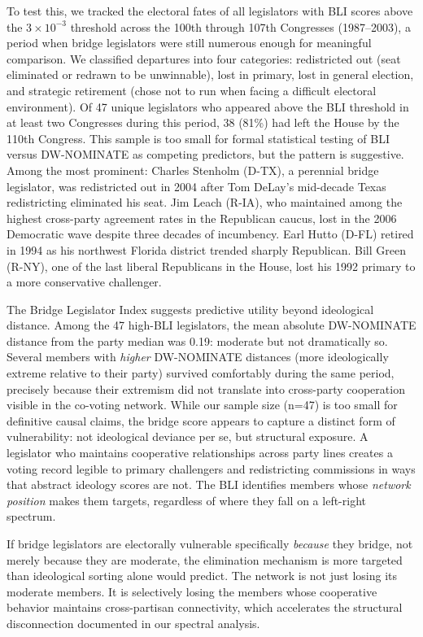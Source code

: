 \documentclass[12pt, a4paper]{article}
\begin{document}
To test this, we tracked the electoral fates of all legislators with BLI scores above the $3 \times 10^{-3}$ threshold across the 100th through 107th Congresses (1987--2003), a period when bridge legislators were still numerous enough for meaningful comparison. We classified departures into four categories: redistricted out (seat eliminated or redrawn to be unwinnable), lost in primary, lost in general election, and strategic retirement (chose not to run when facing a difficult electoral environment). Of 47 unique legislators who appeared above the BLI threshold in at least two Congresses during this period, 38 (81\%) had left the House by the 110th Congress. This sample is too small for formal statistical testing of BLI versus DW-NOMINATE as competing predictors, but the pattern is suggestive. Among the most prominent: Charles Stenholm (D-TX), a perennial bridge legislator, was redistricted out in 2004 after Tom DeLay's mid-decade Texas redistricting eliminated his seat. Jim Leach (R-IA), who maintained among the highest cross-party agreement rates in the Republican caucus, lost in the 2006 Democratic wave despite three decades of incumbency. Earl Hutto (D-FL) retired in 1994 as his northwest Florida district trended sharply Republican. Bill Green (R-NY), one of the last liberal Republicans in the House, lost his 1992 primary to a more conservative challenger.

The Bridge Legislator Index suggests predictive utility beyond ideological distance. Among the 47 high-BLI legislators, the mean absolute DW-NOMINATE distance from the party median was 0.19: moderate but not dramatically so. Several members with \textit{higher} DW-NOMINATE distances (more ideologically extreme relative to their party) survived comfortably during the same period, precisely because their extremism did not translate into cross-party cooperation visible in the co-voting network. While our sample size (n=47) is too small for definitive causal claims, the bridge score appears to capture a distinct form of vulnerability: not ideological deviance per se, but structural exposure. A legislator who maintains cooperative relationships across party lines creates a voting record legible to primary challengers and redistricting commissions in ways that abstract ideology scores are not. The BLI identifies members whose \textit{network position} makes them targets, regardless of where they fall on a left-right spectrum.

If bridge legislators are electorally vulnerable specifically \textit{because} they bridge, not merely because they are moderate, the elimination mechanism is more targeted than ideological sorting alone would predict. The network is not just losing its moderate members. It is selectively losing the members whose cooperative behavior maintains cross-partisan connectivity, which accelerates the structural disconnection documented in our spectral analysis.
\end{document}
